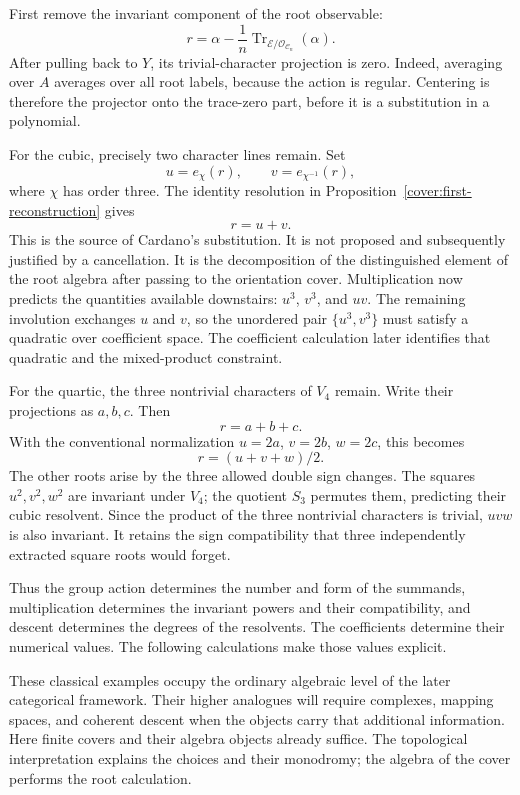 \documentclass[11pt]{article}
\theoremstyle{remark}
\begin{document}
First remove the invariant component of the root observable:
\[
r=\alpha-\frac1n\operatorname{Tr}_{\mathcal E/
\mathcal O_{\mathcal C_n}}(\alpha).
\]
After pulling back to \(Y\), its trivial-character projection is zero. Indeed, averaging over \(A\) averages over all root labels, because the action is regular. Centering is therefore the projector onto the trace-zero part, before it is a substitution in a polynomial.

For the cubic, precisely two character lines remain. Set
\[
u=e_\chi(r),\qquad v=e_{\chi^{-1}}(r),
\]
where \(\chi\) has order three. The identity resolution in
Proposition~\ref{cover:first-reconstruction} gives
\[
\boxed{r=u+v.}
\]
This is the source of Cardano's substitution. It is not proposed and subsequently justified by a cancellation. It is the decomposition of the distinguished element of the root algebra after passing to the orientation cover. Multiplication now predicts the quantities available downstairs:
\(u^3\), \(v^3\), and \(uv\). The remaining involution exchanges \(u\) and \(v\), so the unordered pair \(\{u^3,v^3\}\) must satisfy a quadratic over coefficient space. The coefficient calculation later identifies that quadratic and the mixed-product constraint.

For the quartic, the three nontrivial characters of \(V_4\) remain. Write their projections as \(a,b,c\). Then
\[
r=a+b+c.
\]
With the conventional normalization \(u=2a\), \(v=2b\), \(w=2c\), this becomes
\[
\boxed{r=(u+v+w)/2.}
\]
The other roots arise by the three allowed double sign changes. The squares
\(u^2,v^2,w^2\) are invariant under \(V_4\); the quotient \(S_3\) permutes them, predicting their cubic resolvent. Since the product of the three nontrivial characters is trivial, \(uvw\) is also invariant. It retains the sign compatibility that three independently extracted square roots would forget.

Thus the group action determines the number and form of the summands, multiplication determines the invariant powers and their compatibility, and descent determines the degrees of the resolvents. The coefficients determine their numerical values. The following calculations make those values explicit.

These classical examples occupy the ordinary algebraic level of the later categorical framework. Their higher analogues will require complexes, mapping spaces, and coherent descent when the objects carry that additional information. Here finite covers and their algebra objects already suffice. The topological interpretation explains the choices and their monodromy; the algebra of the cover performs the root calculation.
\end{document}
